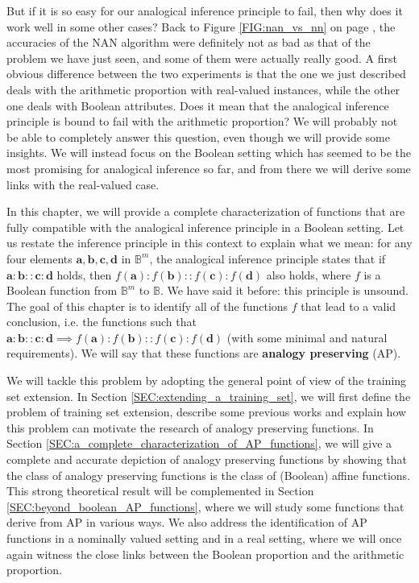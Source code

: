 But if it is so easy for our analogical inference principle to fail, then why
does it work well in some other cases? Back to Figure \ref{FIG:nan_vs_nn} on
page \pageref{FIG:nan_vs_nn}, the accuracies of the NAN algorithm were
definitely not as bad as that of the problem we have just seen, and some of
them were actually really good. A first obvious difference between the two
experiments is that the one we just described deals with the arithmetic
proportion with real-valued instances, while the other one deals with Boolean
attributes. Does it mean that the analogical inference principle is bound to
fail with the arithmetic proportion? We will probably not be able to completely
answer this question, even though we will provide some insights.  We will
instead focus on the Boolean setting which has seemed to be the most promising
for analogical inference so far, and from there we will derive some links with
the real-valued case.

In this chapter, we will provide a complete characterization of functions that
are fully compatible with the analogical inference principle in a Boolean
setting. Let us restate the inference principle in this context to explain what
we mean: for any four elements $\mathbf{a}, \mathbf{b}, \mathbf{c}, \mathbf{d}$
in $\mathbb{B}^m$, the analogical inference principle states that if
$\mathbf{a}: \mathbf{b}:: \mathbf{c}: \mathbf{d}$ holds, then $f(\mathbf{a}):
f(\mathbf{b}):: f(\mathbf{c}): f(\mathbf{d})$ also holds, where $f$ is a Boolean function
from $\mathbb{B}^m$ to $\mathbb{B}$. We have said it before:  this principle is
unsound. The goal of this chapter is to identify all of the functions $f$ that
lead to a valid conclusion, i.e. the functions such that $\mathbf{a}:
\mathbf{b}:: \mathbf{c}: \mathbf{d} \implies f(\mathbf{a}):f(\mathbf{b})::
f(\mathbf{c}): f(\mathbf{d})$ (with some minimal and natural requirements). We
will say that these functions are \textbf{analogy preserving} (AP).

We will tackle this problem by adopting the general point of view of  the
training set extension. In Section \ref{SEC:extending_a_training_set}, we will first
define the problem of training set extension, describe some previous works and
explain how this problem can motivate the research of analogy preserving
functions. In Section \ref{SEC:a_complete_characterization_of_AP_functions}, we
will
give a complete and accurate depiction of analogy preserving functions by
showing that the class of analogy preserving functions is the class of
(Boolean) affine functions. This strong theoretical result will be complemented in
Section \ref{SEC:beyond_boolean_AP_functions}, where we will study some functions that
derive from AP in various ways. We also address the identification of AP
functions in a nominally valued setting and in a real setting, where we will
once again witness the close links between the Boolean proportion and the
arithmetic proportion.

